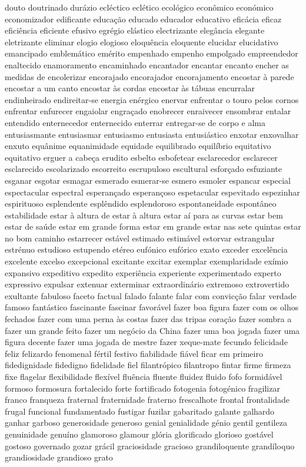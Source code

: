 douto doutrinado dur\'{a}zio ecl\'{e}ctico ecl\'{e}tico ecol\'{o}gico econ\^{o}mico econ\'{o}mico economizador edificante educa\c{c}\~ao educado educador educativo efic\'{a}cia eficaz efici\^{e}ncia eficiente efusivo egr\'{e}gio el\'{a}stico electrizante eleg\^{a}ncia elegante eletrizante eliminar elogio elogioso eloqu\^{e}ncia eloquente elucidar elucidativo emancipado emblem\'{a}tico em\'{e}rito empenhado empenho empolgado empreendedor enaltecido enamoramento encaminhado encantador encantar encanto encher as medidas de encolerizar encorajado encorajador encorajamento encostar \`{a} parede encostar a um canto encostar \`{a}s cordas encostar \`{a}s t\'{a}buas encurralar endinheirado endireitar-se energia en\'{e}rgico enervar enfrentar o touro pelos cornos enfrentar enfurecer engaiolar engra\c{c}ado enobrecer enraivecer ensombrar entalar entendido enternecedor enternecido enterrar entregar-se de corpo e alma entusiasmante entusiasmar entusiasmo entusiasta entusi\'{a}stico enxotar enxovalhar enxuto equ\^{a}nime equanimidade equidade equilibrado equil\'{i}brio equitativo equitativo erguer a cabe\c{c}a erudito esbelto esbofetear esclarecedor esclarecer esclarecido escolarizado escorreito escrupuloso escultural esfor\c{c}ado esfuziante esganar esgotar esmagar esmerado esmerar-se esmero esmoler espancar especial espectacular espectral esperan\c{c}ado esperan\c{c}oso espetacular espevitado espezinhar espirituoso esplendente espl\^{e}ndido esplendoroso espontaneidade espont\^{a}neo estabilidade estar \`{a} altura de estar \`{a} altura estar a\'{i} para as curvas estar bem estar de sa\'{u}de estar em grande forma estar em grande estar nas sete quintas estar no bom caminho estarrecer est\'{a}vel estimado estim\'{a}vel estorvar estrangular estr\'{e}nuo estudioso estupendo et\'{e}reo euf\'{o}nico euf\'{o}rico exato exceder excel\^{e}ncia excelente excelso excepcional excitante excitar exemplar exemplaridade ex\'{i}mio expansivo expeditivo expedito experi\^{e}ncia experiente experimentado experto expressivo expulsar extenuar exterminar extraordin\'{a}rio extremoso extrovertido exultante fabuloso faceto factual falado falante falar com convic\c{c}\~ao falar verdade famoso fant\'{a}stico fascinante fascinar favor\'{a}vel fazer boa figura fazer com os olhos fechados fazer com uma perna \`{a}s costas fazer das tripas cora\c{c}\~ao fazer sombra a fazer um grande feito fazer um neg\'{o}cio da China fazer uma boa jogada fazer uma figura decente fazer uma jogada de mestre fazer xeque-mate fecundo felicidade feliz felizardo fenomenal f\'{e}rtil festivo fiabilidade fi\'{a}vel ficar em primeiro fidedignidade fidedigno fidelidade fiel filantr\'{o}pico filantropo fintar firme firmeza fixe flagelar flexibilidade flex\'{i}vel flu\^{e}ncia fluente fluidez fluido fofo formid\'{a}vel formoso formosura fortalecido forte fortificado fotogenia fotog\'{e}nico fragilizar franco franqueza fraternal fraternidade fraterno frescalhote frontal frontalidade frugal funcional fundamentado fustigar fuzilar gabaritado galante galhardo ganhar garboso generosidade generoso genial genialidade g\'{e}nio gentil gentileza genuinidade genu\'{i}no glamoroso glamour gl\'{o}ria glorificado glorioso gost\'{a}vel gostoso governado gozar gr\'{a}cil graciosidade gracioso grandiloquente grand\'{i}loquo grandiosidade grandioso grato 
